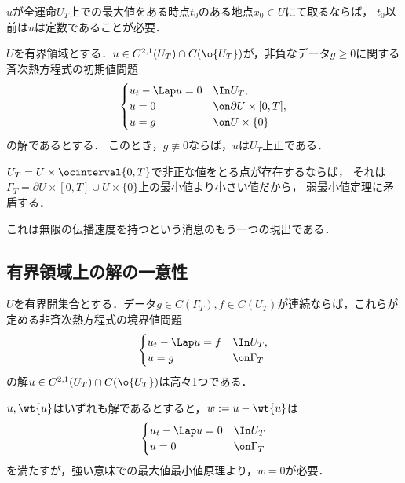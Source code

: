 \documentclass[uplatex,dvipdfmx]{jsreport}
\begin{document}
\begin{remarks}
    $u$が全運命$U_T$上での最大値をある時点$t_0$のある地点$x_0\in U$にて取るならば，
    $t_0$以前は$u$は定数であることが必要．
\end{remarks}

\begin{corollary}
    $U$を有界領域とする．$u\in C^{2,1}(U_T)\cap C(\o{U_T})$が，非負なデータ$g\ge0$に関する
    斉次熱方程式の初期値問題
    \[\begin{cases}
        u_t-\Lap u=0&\In U_T,\\
        u=0&\on \partial U\times[0,T],\\
        u=g&\on U\times\{0\}
    \end{cases}\]
    の解であるとする．
    このとき，$g\not\equiv0$ならば，$u$は$U_T$上正である．
\end{corollary}
\begin{Proof}
    $U_T=U\times\ocinterval{0,T}$で非正な値をとる点が存在するならば，
    それは$\Gamma_T=\partial U\times[0,T]\cup U\times\{0\}$上の最小値より小さい値だから，
    弱最小値定理に矛盾する．
\end{Proof}
\begin{remarks}
    これは無限の伝播速度を持つという消息のもう一つの現出である．
\end{remarks}

\subsection{有界領域上の解の一意性}

\begin{theorem}[有界領域上の初期値問題の解の一意性]
    $U$を有界開集合とする．データ$g\in C(\Gamma_T),f\in C(U_T)$が連続ならば，これらが定める非斉次熱方程式の境界値問題
    \[\begin{cases}
        u_t-\Lap u=f&\In U_T,\\
        u=g&\on \Gamma_T
    \end{cases}\]
    の解$u\in C^{2,1}(U_T)\cap C(\o{U_T})$は高々1つである．
\end{theorem}
\begin{Proof}
    $u,\wt{u}$はいずれも解であるとすると，$w:=u-\wt{u}$は
    \[\begin{cases}
        u_t-\Lap u=0&\In U_T\\
        u=0&\on\Gamma_T
    \end{cases}\]
    を満たすが，強い意味での最大値最小値原理より，$w=0$が必要．
\end{Proof}
\end{document}
